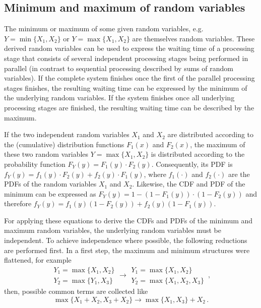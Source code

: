 \subsection{Minimum and maximum of random variables}
The minimum or maximum of some given random variables, e.g. $Y=\min\{X_1,X_2\}$ or 
$Y=\max\{X_1,X_2\}$ are themselves random variables. These derived random variables can be used to
express the waiting time of a processing stage that consists of several independent processing stages being
performed in parallel (in contrast to sequential processing described by sums of random variables). 
If the complete system finishes once the first of the parallel processing stages finishes, the 
resulting waiting time can be expressed by the minimum of the underlying random variables. If the system
finishes once all underlying processing stages are finished, the resulting waiting time can be described
by the maximum.	 

If the two independent random variables $X_1$ and $X_2$ are distributed according to the (cumulative) distribution
functions $F_1(x)$ and $F_2(x)$, the maximum of these two random variables $Y=\max\{X_1,X_2\}$
is distributed according to the probability function $F_Y(y)=F_1(y)\cdot F_2(y)$. Consequently, its PDF
is $f_Y(y)=f_1(y)\cdot F_2(y) + f_2(y)\cdot F_1(y)$, where $f_1(\cdot)$ and $f_2(\cdot)$ are the PDFs
of the random variables $X_1$ and $X_2$. Likewise, the CDF and PDF of the minimum can be expressed as
$F_Y(y)=1-(1-F_1(y))\cdot(1-F_2(y))$ and therefore $f_Y(y) = f_1(y)(1-F_2(y)) + f_2(y)(1-F_1(y))$.

For applying these equations to derive the CDFs and PDFs of the minimum and maximum random variables, the 
underlying random variables must be independent. To achieve independence where possible, the following 
reductions are performed first. In a first step, the maximum and minimum structures were flattened, for example
\begin{equation}
 \begin{array}{l}
  Y_1 = \max\{X_1,X_2\}\\
  Y_2 = \max\{Y_1,X_3\}
 \end{array} \longrightarrow
 \begin{array}{l}
  Y_1 = \max\{X_1,X_2\}\\
  Y_2 = \max\{X_1,X_2,X_3\}
 \end{array}\,, \nonumber
\end{equation}
then, possible common terms are collected like
\begin{equation}
 \max\{X_1 + X_2, X_3 + X_2\} \longrightarrow \max\{X_1,X_3\}+X_2\,. \nonumber
\end{equation}

